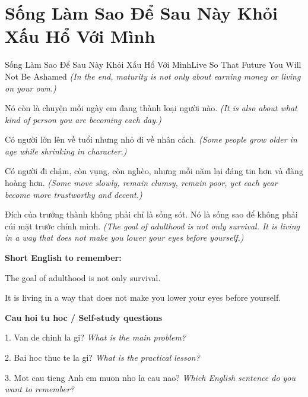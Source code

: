\section{Sống Làm Sao Để Sau Này Khỏi Xấu Hổ Với Mình}
\begin{truyen}{Sống Làm Sao Để Sau Này Khỏi Xấu Hổ Với Mình}{Live So That Future You Will Not Be Ashamed}
\textit{(In the end, maturity is not only about earning money or living on your own.)}

Nó còn là chuyện mỗi ngày em đang thành loại người nào.
\textit{(It is also about what kind of person you are becoming each day.)}

Có người lớn lên về tuổi nhưng nhỏ đi về nhân cách.
\textit{(Some people grow older in age while shrinking in character.)}

Có người đi chậm, còn vụng, còn nghèo, nhưng mỗi năm lại đáng tin hơn và đàng hoàng hơn.
\textit{(Some move slowly, remain clumsy, remain poor, yet each year become more trustworthy and decent.)}

\end{truyen}

\begin{baihoc}
Đích của trưởng thành không phải chỉ là sống sót. Nó là sống sao để không phải cúi mặt trước chính mình.
\textit{(The goal of adulthood is not only survival. It is living in a way that does not make you lower your eyes before yourself.)}
\end{baihoc}

\begin{ghinhoanh}
\textbf{Short English to remember:}

The goal of adulthood is not only survival.

It is living in a way that does not make you lower your eyes before yourself.

\end{ghinhoanh}

\begin{tuhocnhanh}
\textbf{Cau hoi tu hoc / Self-study questions}

1. Van de chinh la gi? \textit{What is the main problem?}

2. Bai hoc thuc te la gi? \textit{What is the practical lesson?}

3. Mot cau tieng Anh em muon nho la cau nao? \textit{Which English sentence do you want to remember?}
\end{tuhocnhanh}
\ngancach

